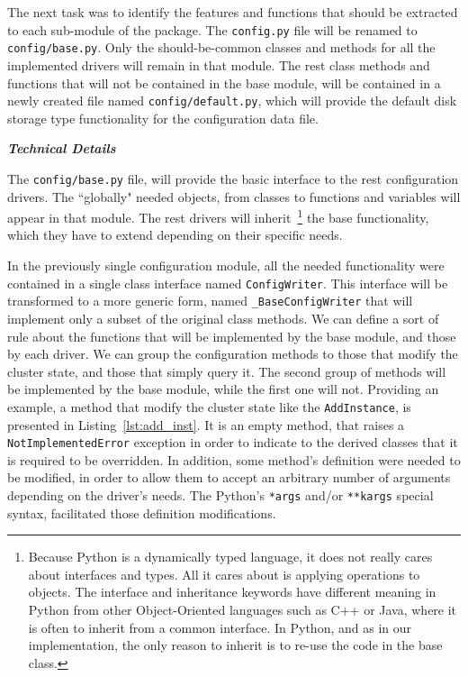 \begin{description}
    \bigskip
    The next task was to identify the features and functions that should be
    extracted to each sub-module of the package. The \texttt{config.py} file
    will be renamed to \texttt{config/base.py}. Only the should-be-common
    classes and methods for all the implemented drivers will remain in that
    module. The rest class methods and functions that will not be contained in
    the base module, will be contained in a newly created file named
    \texttt{config/default.py}, which will provide the default disk storage type
    functionality for the configuration data file.

    \emph{\textbf{Technical Details}}

    The \texttt{config/base.py} file, will provide the basic interface to the
    rest configuration drivers. The ``globally" needed objects, from classes to
    functions and variables will appear in that module. The rest drivers will
    inherit~\footnote{Because Python is a dynamically typed language, it does
    not really cares about interfaces and types. All it cares about is applying
    operations to objects. The interface and inheritance keywords have different
    meaning in Python from other Object-Oriented languages such as C++ or Java,
    where it is often to inherit from a common interface. In Python, and as in
    our implementation, the only reason to inherit is to re-use the code in the
    base class.} the base functionality, which they have to extend depending on
    their specific needs.

    In the previously single configuration module, all the needed functionality
    were contained in a single class interface named \texttt{ConfigWriter}. This
    interface will be transformed to a more generic form, named
    \texttt{\_BaseConfigWriter} that will implement only a subset of the original
    class methods. We can define a sort of rule about the functions that will be
    implemented by the base module, and those by each driver. We can group the
    configuration methods to those that modify the cluster state, and those that
    simply query it. The second
    group of methods will be implemented by the base module, while the first one
    will not. Providing an example, a method that modify the cluster state
    like the \texttt{AddInstance}, is presented in Listing~\ref{lst:add_inst}.
    It is an empty method, that raises a \texttt{NotImplementedError} exception
    in order to indicate to the derived classes that it is required to be
    overridden. In addition, some method's definition were needed to be modified,
    in order to allow them to accept an arbitrary number of arguments depending
    on the driver's needs. The Python's \texttt{*args} and/or \texttt{**kargs}
    special syntax, facilitated those definition modifications.


\end{description}
